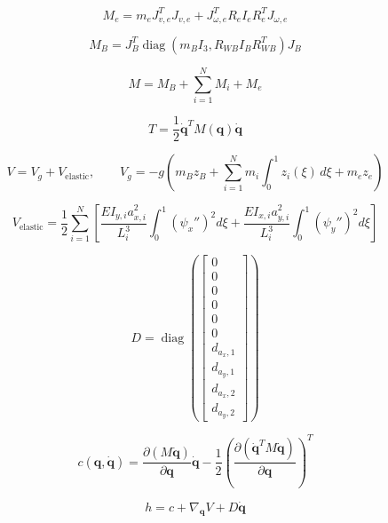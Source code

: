 \documentclass[11pt]{article}
\begin{document}
\begin{equation}
M_e=m_eJ_{v,e}^{T}J_{v,e}+J_{\omega,e}^{T}R_eI_eR_e^TJ_{\omega,e}
\end{equation}

\begin{equation}
M_B=J_B^T\operatorname{diag}\!\left(m_BI_3,R_{WB}I_BR_{WB}^T\right)J_B
\end{equation}

\begin{equation}
M=M_B+\sum_{i=1}^{N}M_i+M_e\label{eq:mass-assembly}
\end{equation}

\begin{equation}
T=\frac12\dot{\boldsymbol q}^{T}M(\boldsymbol q)\dot{\boldsymbol q}
\end{equation}

\begin{equation}
V=V_g+V_{\mathrm{elastic}},\qquad V_g=-g\!\left(m_Bz_B+\sum_{i=1}^{N}m_i\int_0^1z_i(\xi)\,d\xi+m_ez_e\right)
\end{equation}

\begin{equation}
V_{\mathrm{elastic}}=\frac12\sum_{i=1}^{N}\left[\frac{EI_{y,i}a_{x,i}^{2}}{L_i^3}\int_0^1(\psi_x'')^2d\xi+\frac{EI_{x,i}a_{y,i}^{2}}{L_i^3}\int_0^1(\psi_y'')^2d\xi\right]
\end{equation}

\begin{equation}
D=\operatorname{diag}\!\left(\begin{bmatrix}0\\0\\0\\0\\0\\0\\d_{a_x,1}\\d_{a_y,1}\\d_{a_x,2}\\d_{a_y,2}\end{bmatrix}\right)
\end{equation}

\begin{equation}
c(\boldsymbol q,\dot{\boldsymbol q})=\frac{\partial(M\dot{\boldsymbol q})}{\partial\boldsymbol q}\dot{\boldsymbol q}-\frac12\left(\frac{\partial(\dot{\boldsymbol q}^{T}M\dot{\boldsymbol q})}{\partial\boldsymbol q}\right)^T
\end{equation}

\begin{equation}
h=c+\nabla_{\boldsymbol q}V+D\dot{\boldsymbol q}
\end{equation}
\end{document}
